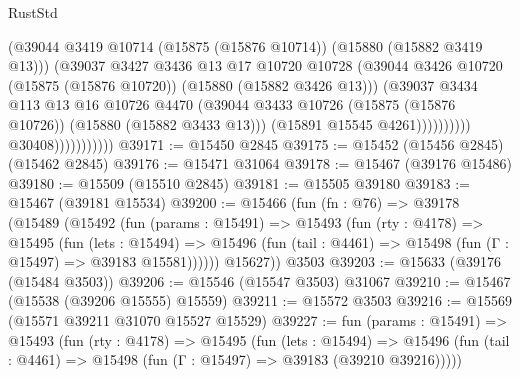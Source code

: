 \begin{lexlean}{RustStd}
\begin{coremodule}
                                        (@39044
                                          @3419
                                          @10714
                                          (@15875 (@15876 @10714))
                                          (@15880 (@15882 @3419 @13)))
                                        (@39037
                                          @3427
                                          @3436
                                          @13
                                          @17
                                          @10720
                                          @10728
                                          (@39044
                                            @3426
                                            @10720
                                            (@15875 (@15876 @10720))
                                            (@15880 (@15882 @3426 @13)))
                                          (@39037
                                            @3434
                                            @113
                                            @13
                                            @16
                                            @10726
                                            @4470
                                            (@39044
                                              @3433
                                              @10726
                                              (@15875 (@15876 @10726))
                                              (@15880 (@15882 @3433 @13)))
                                            (@15891 @15545 @4261))))))))))
                          @30408)))))))))))
@39171 := @15450 @2845
@39175 := @15452 (@15456 @2845) (@15462 @2845)
@39176 := @15471 @31064
@39178 := @15467 (@39176 @15486)
@39180 := @15509 (@15510 @2845)
@39181 := @15505 @39180
@39183 := @15467 (@39181 @15534)
@39200 := @15466
    (fun (fn : @76) =>
    @39178
      (@15489
        (@15492
          (fun (params : @15491) =>
          @15493
            (fun (rty : @4178) =>
            @15495
              (fun (lets : @15494) =>
              @15496 (fun (tail : @4461) => @15498 (fun (Γ : @15497) => @39183 @15581))))))
        @15627))
    @3503
@39203 := @15633 (@39176 (@15484 @3503))
@39206 := @15546 (@15547 @3503) @31067
@39210 := @15467 (@15538 (@39206 @15555) @15559)
@39211 := @15572 @3503
@39216 := @15569 (@15571 @39211 @31070 @15527 @15529)
@39227 := fun (params : @15491) =>
  @15493
    (fun (rty : @4178) =>
    @15495
      (fun (lets : @15494) =>
      @15496 (fun (tail : @4461) => @15498 (fun (Γ : @15497) => @39183 (@39210 @39216)))))

\end{coremodule}
\end{lexlean}
